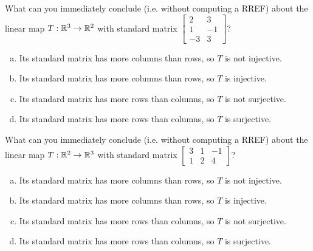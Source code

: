 \begin{applicationActivities}
\begin{activity}{3}
  What can you immediately conclude (i.e. without computing a RREF) about the linear map \(T:\mathbb{R}^3\to\mathbb{R}^2\) with standard matrix \(\begin{bmatrix} 2 & 3 \\ 1 & -1 \\ -3 & 3 \end{bmatrix}\)?
  \begin{enumerate}[a)]
    \item Its standard matrix has more columns than rows, so \(T\) is not
    injective.
    \item Its standard matrix has more columns than rows, so \(T\) is
    injective.
    \item Its standard matrix has more rows than columns, so \(T\) is not
    surjective.
    \item Its standard matrix has more rows than columns, so \(T\) is
    surjective.
  \end{enumerate}
\end{activity}

\begin{activity}{2}
  What can you immediately conclude (i.e. without computing a RREF) about the linear map \(T:\mathbb{R}^2\to\mathbb{R}^3\) with standard matrix \(\begin{bmatrix} 3 & 1 & -1 \\ 1 & 2 & 4 \end{bmatrix}\)?
  \begin{enumerate}[a)]
    \item Its standard matrix has more columns than rows, so \(T\) is not
    injective.
    \item Its standard matrix has more columns than rows, so \(T\) is
    injective.
    \item Its standard matrix has more rows than columns, so \(T\) is not
    surjective.
    \item Its standard matrix has more rows than columns, so \(T\) is
    surjective.
  \end{enumerate}
\end{activity}


\end{applicationActivities}
